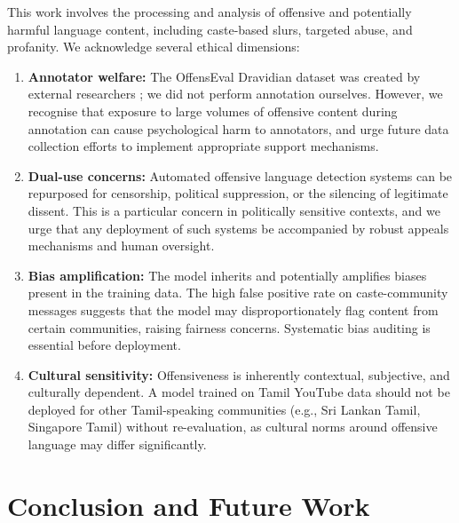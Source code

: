 \documentclass[12pt, a4paper]{article}
\begin{document}
This work involves the processing and analysis of offensive and potentially harmful language content, including caste-based slurs, targeted abuse, and profanity. We acknowledge several ethical dimensions:

\begin{enumerate}[leftmargin=2em]
    \item \textbf{Annotator welfare:} The OffensEval Dravidian dataset was created by external researchers \citep{chakravarthi2021dataset}; we did not perform annotation ourselves. However, we recognise that exposure to large volumes of offensive content during annotation can cause psychological harm to annotators, and urge future data collection efforts to implement appropriate support mechanisms.
    
    \item \textbf{Dual-use concerns:} Automated offensive language detection systems can be repurposed for censorship, political suppression, or the silencing of legitimate dissent. This is a particular concern in politically sensitive contexts, and we urge that any deployment of such systems be accompanied by robust appeals mechanisms and human oversight.
    
    \item \textbf{Bias amplification:} The model inherits and potentially amplifies biases present in the training data. The high false positive rate on caste-community messages suggests that the model may disproportionately flag content from certain communities, raising fairness concerns. Systematic bias auditing is essential before deployment.
    
    \item \textbf{Cultural sensitivity:} Offensiveness is inherently contextual, subjective, and culturally dependent. A model trained on Tamil YouTube data should not be deployed for other Tamil-speaking communities (e.g., Sri Lankan Tamil, Singapore Tamil) without re-evaluation, as cultural norms around offensive language may differ significantly.
\end{enumerate}

\FloatBarrier

\section{Conclusion and Future Work}
\label{sec:conclusion}
\end{document}

